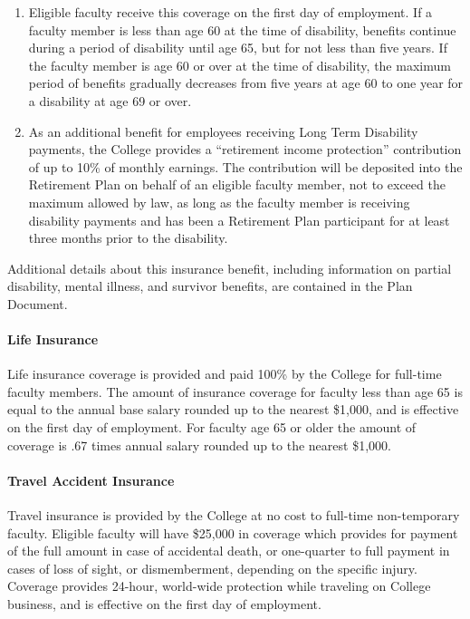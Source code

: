 \begin{enumerate}[label=\alph*)]
{\begin{enumerate}[label=\arabic*)]
							\item{Eligible faculty receive this coverage on the first day of employment.  If a faculty member is less than age 60 at the time of disability, benefits continue during a period of disability until age 65, but for not less than five years.  If the faculty member is age 60 or over at the time of disability, the maximum period of benefits gradually decreases from five years at age 60 to one year for a disability at age 69 or over.}
							\item{As an additional benefit for employees receiving Long Term Disability payments, the College provides a ``retirement income protection'' contribution of up to 10\% of monthly earnings.  The contribution will be deposited into the Retirement Plan on behalf of an eligible faculty member, not to exceed the maximum allowed by law, as long as the faculty member is receiving disability payments and has been a Retirement Plan participant for at least three months prior to the disability.}
						\end{enumerate}
					}

					Additional details about this insurance benefit, including information on partial disability, mental illness, and survivor benefits, are contained in the Plan Document.
				\end{enumerate}
			\paragraph{Life Insurance}
				Life insurance coverage is provided and paid 100\% by the College for
				full-time faculty members.  The amount of insurance coverage for faculty less
				than age 65 is equal to the annual base salary rounded up to the nearest
				\$1,000, and is effective on the first day of employment.  For faculty age 65
				or older the amount of coverage is .67 times annual salary rounded up to the
				nearest \$1,000.
			\paragraph{Travel Accident Insurance}
				Travel insurance is provided by the College at no cost to full-time
				non-temporary faculty.  Eligible faculty will have \$25,000 in coverage which provides for payment of the full amount in case of accidental death, or one-quarter to full payment in cases of loss of sight, or dismemberment, depending on the specific injury.  Coverage provides 24-hour, world-wide protection while traveling on College business, and is effective on the first day of employment.
